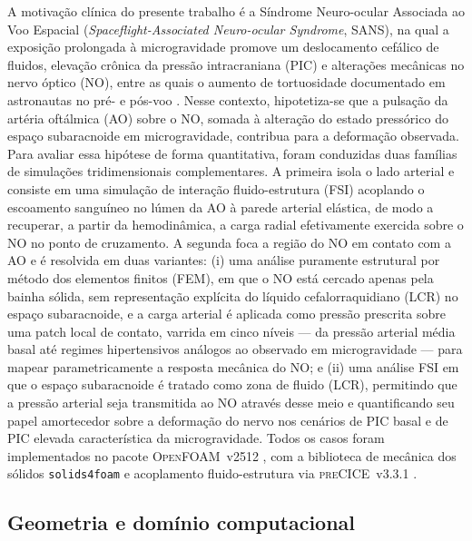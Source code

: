 A motivação clínica do presente trabalho é a Síndrome Neuro-ocular Associada ao Voo Espacial (\emph{Spaceflight-Associated Neuro-ocular Syndrome}, SANS), na qual a exposição prolongada à microgravidade promove um deslocamento cefálico de fluidos, elevação crônica da pressão intracraniana (PIC) e alterações mecânicas no nervo óptico (NO), entre as quais o aumento de tortuosidade documentado em astronautas no pré- e pós-voo \citep{Lee2020NPJ}. Nesse contexto, hipotetiza-se que a pulsação da artéria oftálmica (AO) sobre o NO, somada à alteração do estado pressórico do espaço subaracnoide em microgravidade, contribua para a deformação observada. Para avaliar essa hipótese de forma quantitativa, foram conduzidas duas famílias de simulações tridimensionais complementares. A primeira isola o lado arterial e consiste em uma simulação de interação fluido-estrutura (FSI) acoplando o escoamento sanguíneo no lúmen da AO à parede arterial elástica, de modo a recuperar, a partir da hemodinâmica, a carga radial efetivamente exercida sobre o NO no ponto de cruzamento. A segunda foca a região do NO em contato com a AO e é resolvida em duas variantes: (i) uma análise puramente estrutural por método dos elementos finitos (FEM), em que o NO está cercado apenas pela bainha sólida, sem representação explícita do líquido cefalorraquidiano (LCR) no espaço subaracnoide, e a carga arterial é aplicada como pressão prescrita sobre uma patch local de contato, varrida em cinco níveis --- da pressão arterial média basal até regimes hipertensivos análogos ao observado em microgravidade --- para mapear parametricamente a resposta mecânica do NO; e (ii) uma análise FSI em que o espaço subaracnoide é tratado como zona de fluido (LCR), permitindo que a pressão arterial seja transmitida ao NO através desse meio e quantificando seu papel amortecedor sobre a deformação do nervo nos cenários de PIC basal e de PIC elevada característica da microgravidade. Todos os casos foram implementados no pacote \textsc{OpenFOAM}~v2512 \citep{Jasak1996}, com a biblioteca de mecânica dos sólidos \texttt{solids4foam} \citep{Cardiff2018s4f} e acoplamento fluido-estrutura via \textsc{preCICE}~v3.3.1 \citep{Chourdakis2022}.

\subsection{Geometria e domínio computacional}
\label{sec:metodologia-geometria}

